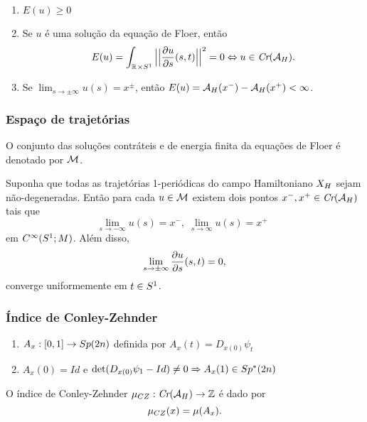 \documentclass{beamer}
\begin{document}
\begin{footnotesize}
\begin{frame}
		\begin{enumerate}
			\item $E(u)\geq0$
			
			\item Se $u$ é uma solução da equação de Floer, então
			$$
			E(u)=\int_{\mathbb{R}^{} \times S^{1}}\Big|\Big|\frac{\partial u}{\partial s}(s,t)\Big|\Big|^{2} =0 \Leftrightarrow u \in \textit{Cr}(\mathcal{A}_{H}).
			$$
			
			\item Se $\lim_{s\to \pm\infty}u(s)=x^{\pm}$, então $E(u)=\mathcal{A}_{H}(x^{-}) - \mathcal{A}_{H}(x^{+})<\infty$.
		\end{enumerate}
	\end{frame}

	\begin{frame}
		\frametitle{Espaço de trajetórias}
		O conjunto das soluções contráteis e de energia finita da equações de Floer é denotado por $\mathcal{M}$.
		
		\begin{teorema}\label{teorema_limite_solucoes_energia_finita}
			Suponha que todas as trajetórias 1-periódicas do campo Hamiltoniano $X_{H}$ sejam não-degeneradas. Então para cada $u \in \mathcal{M}$ existem dois pontos $x^{-}, x^{+}\in \textit{Cr}(\mathcal{A}_{H})$ tais que
			$$
			\lim_{s\to -\infty}u(s)=x^{-},\; \lim_{s\to \infty}u(s)=x^{+}\;\;
			$$
			em $C^{\infty}(S^{1};M)$. Além disso, 
			$$
			\lim_{s\to \pm \infty}\frac{\partial u}{\partial s}(s,t) = 0,
			$$
			converge uniformemente em $t\in S^{1}$.
		\end{teorema}
		
	\end{frame}

	
	\begin{frame}
		
		\frametitle{Índice de Conley-Zehnder}
		\begin{enumerate}
			\item $A_{x}:[0,1] \to Sp(2n)$ definida por $A_{x}(t) = D_{x(0)}\psi_{t}$
			
			\item $A_{x}(0) =Id$ e $\det(D_{x(0)}\psi_{1}-Id) \neq 0 \Rightarrow A_{x}(1)\in Sp^{*}(2n)$ 
		\end{enumerate}
		
		O índice de Conley-Zehnder $\mu_{CZ}:\textit{Cr}(\mathcal{A}_{H}) \to \mathbb{Z}$ é dado por 
		$$
		\mu_{CZ}(x) = \mu(A_{x}).
		$$
		

\end{frame}
\end{footnotesize}
\end{document}
